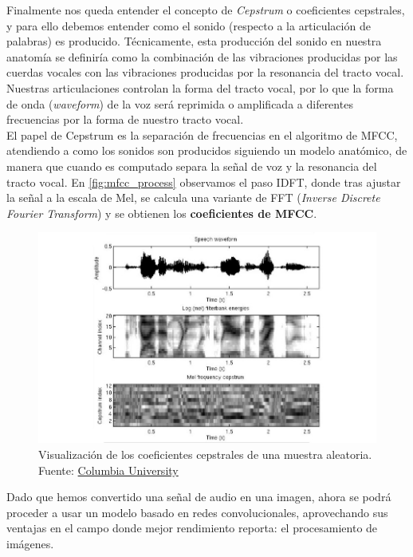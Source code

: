 \documentclass[11pt,a4paper,spanish]{book}
\begin{document}
		Finalmente nos queda entender el concepto de \emph{Cepstrum} o coeficientes cepstrales, y para ello debemos entender como el sonido (respecto a la articulación de palabras) es producido. Técnicamente, esta producción del sonido en nuestra anatomía se definiría como la combinación de las vibraciones producidas por las cuerdas vocales con las vibraciones producidas por la resonancia del tracto vocal. Nuestras articulaciones controlan la forma del tracto vocal, por lo que la forma de onda (\emph{waveform}) de la voz será reprimida o amplificada a diferentes frecuencias por la forma de nuestro tracto vocal.\\
	El papel de Cepstrum es la separación de frecuencias en el algoritmo de MFCC, atendiendo a como los sonidos son producidos siguiendo un modelo anatómico, de manera que cuando es computado separa la señal de voz y la resonancia del tracto vocal. En \ref{fig:mfcc_process} observamos el paso IDFT, donde tras ajustar la señal a la escala de Mel, se calcula una variante de FFT (\emph{Inverse Discrete Fourier Transform}) y se obtienen los \textbf{coeficientes de MFCC}.
	
	\begin{figure}[h]
		\centering
		\includegraphics[scale=0.3]{waveform_process.jpeg} 
		\caption{Visualización de los coeficientes cepstrales de una muestra aleatoria. Fuente: \href{https://www.ee.columbia.edu/~stanchen/spring16/e6870/slides/lecture3.pdf}{Columbia University}}
	\end{figure}
	
	Dado que hemos convertido una señal de audio en una imagen, ahora se podrá proceder a usar un modelo basado en redes convolucionales, aprovechando sus ventajas en el campo donde mejor rendimiento reporta: el procesamiento de imágenes.
	
	\printbibliography
	
\end{document}
